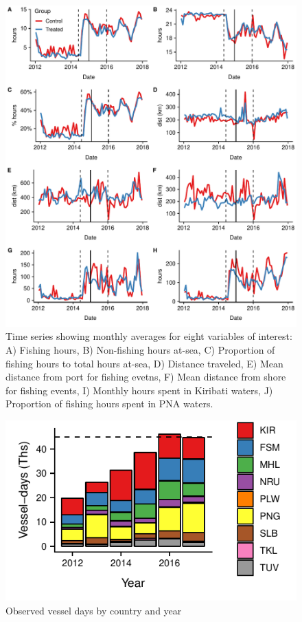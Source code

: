 \documentclass[9p,twocolumn,twoside,lineno]{pnas-new}
\begin{document}
\clearpage

\begin{figure}
\centering
\includegraphics{img/all_panels.pdf}
\caption{\label{fig:all_panels}Time series showing monthly averages for eight variables of interest: A) Fishing hours, B) Non-fishing hours at-sea, C) Proportion of fishing hours to total hours at-sea, D) Distance traveled, E) Mean distance from port for fishing evetns, F) Mean distance from shore for fishing events, I) Monthly hours spent in Kiribati waters, J) Proportion of fishing hours spent in PNA waters.}
\end{figure}

\clearpage

\begin{figure}
\centering
	\includegraphics{img/all_PS_VDS_cty_year.pdf}
	\caption{\label{fig:all_PS_VDS_cty_year}Observed vessel days by country and year}
\end{figure}
\end{document}
